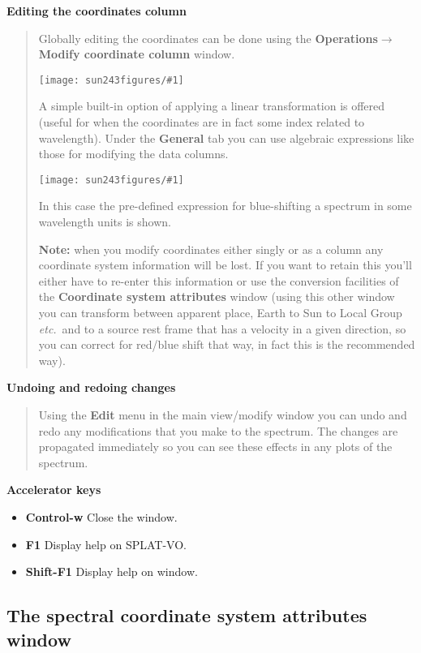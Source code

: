 \documentclass[twoside,11pt]{article}
\newcommand{\htmladdimg}[1]{}
\newcommand{\latexhtml}[2]{#1}
\renewcommand{\_}{\texttt{\symbol{95}}}
\newcommand{\SPLAT}{\textsf{SPLAT-VO}}
\newcommand{\mainfigure}[1]
{\begin{center}
 \latexhtml{\texttt{[image: sun243\_figures/\#1]}}{\htmladdimg{#1.gif}}
 \end{center}
}
\newcommand{\menuitem}[1]{\textbf{#1}}
\newcommand{\submenuitem}[2]{\latexhtml{\textbf{#1$\rightarrow$#2}}{\textbf{#1->#2}}}
\newcommand{\labelitem}[1]{\textbf{#1}}
\newcommand{\etc}{\textit{etc.}}
\newcommand{\subheading}[1]{\textbf{\large{#1}}}
\begin{document}
\subheading{Editing the coordinates column}
\begin{quote}
 Globally editing the coordinates can be done using the
 \submenuitem{Operations}{Modify coordinate column} window.

 \mainfigure{coordeditwindow}

 A simple built-in option of applying a linear transformation is
 offered (useful for when the coordinates are in fact some index
 related to wavelength). Under the \labelitem{General} tab you can
 use algebraic expressions like those for modifying the data columns.

 \mainfigure{coordeditwindow2}

 In this case the pre-defined expression for blue-shifting a spectrum
 in some wavelength units is shown.

 \labelitem{Note:} when you modify coordinates either singly or as a
 column any coordinate system information will be lost. If you want to
 retain this you'll either have to re-enter this information or use
 the conversion facilities of the \labelitem{Coordinate system
 attributes} window (using this other window you can transform between
 apparent place, Earth to Sun to Local Group \etc\ and to a source
 rest frame that has a velocity in a given direction, so you can
 correct for red/blue shift that way, in fact this is the recommended way).

\end{quote}

\subheading{Undoing and redoing changes}
\begin{quote}
Using the \menuitem{Edit} menu in the main view/modify window you can
undo and redo any modifications that you make to the spectrum. The
changes are propagated immediately so you can see these effects in any
plots of the spectrum.
\end{quote}

\subheading{Accelerator keys}

\begin{itemize}
\item \labelitem{Control-w} Close the window.
\item \labelitem{F1} Display help on \SPLAT.
\item \labelitem{Shift-F1} Display help on window.
\end{itemize}

\newpage
\subsection{The spectral coordinate system attributes window}
\end{document}
